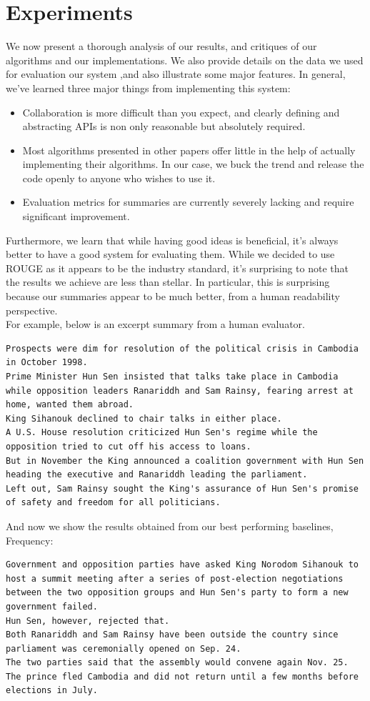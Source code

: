 \documentclass[10pt]{article}
\begin{document}
\section{Experiments}
We now present a thorough analysis of our results, and critiques of our algorithms and our implementations. We also provide details on the data we used for evaluation our system ,and also illustrate some major features. In general, we've learned three major things from implementing this system:
\begin{itemize}
\item Collaboration is more difficult than you expect, and clearly defining and abstracting APIs is non only reasonable but absolutely required.
\item Most algorithms presented in other papers offer little in the help of actually implementing their algorithms. In our case, we buck the trend and release the code openly to anyone who wishes to use it.
\item Evaluation metrics for summaries are currently severely lacking and require significant improvement.
\end{itemize}

Furthermore, we learn that while having good ideas is beneficial, it's always better to have a good system for evaluating them. While we decided to use ROUGE as it appears to be the industry standard, it's surprising to note that the results we achieve are less than stellar. In particular, this is surprising because our summaries appear to be much better, from a human readability perspective. \\

For example, below is an excerpt summary from a human evaluator.
\begin{lstlisting}[breaklines]
Prospects were dim for resolution of the political crisis in Cambodia in October 1998.
Prime Minister Hun Sen insisted that talks take place in Cambodia while opposition leaders Ranariddh and Sam Rainsy, fearing arrest at home, wanted them abroad.
King Sihanouk declined to chair talks in either place.
A U.S. House resolution criticized Hun Sen's regime while the opposition tried to cut off his access to loans.
But in November the King announced a coalition government with Hun Sen heading the executive and Ranariddh leading the parliament.
Left out, Sam Rainsy sought the King's assurance of Hun Sen's promise of safety and freedom for all politicians.
\end{lstlisting}

And now we show the results obtained from our best performing baselines, Frequency:
\begin{lstlisting}[breaklines]
Government and opposition parties have asked King Norodom Sihanouk to host a summit meeting after a series of post-election negotiations between the two opposition groups and Hun Sen's party to form a new government failed.
Hun Sen, however, rejected that.
Both Ranariddh and Sam Rainsy have been outside the country since parliament was ceremonially opened on Sep. 24.
The two parties said that the assembly would convene again Nov. 25.
The prince fled Cambodia and did not return until a few months before elections in July.
\end{lstlisting}
\end{document}
